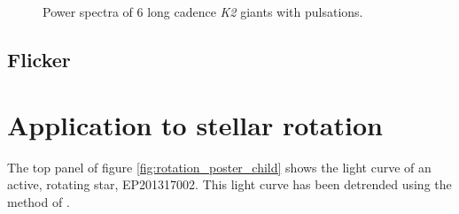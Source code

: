 \documentclass[useAMS, usenatbib]{aastex}
\begin{document}
\begin{figure}
\begin{center}
{        }
    \end{center}
    \caption{Power spectra of 6 long cadence {\it K2} giants with pulsations.
\label{fig:astero_examples}}
\end{figure}

\subsection{Flicker}

\section{Application to stellar rotation}
The top panel of figure \ref{fig:rotation_poster_child} shows the light curve
of an active, rotating star, EP201317002.
This light curve has been detrended using the method of
\citet{Vanderburg2014}.
\end{document}
